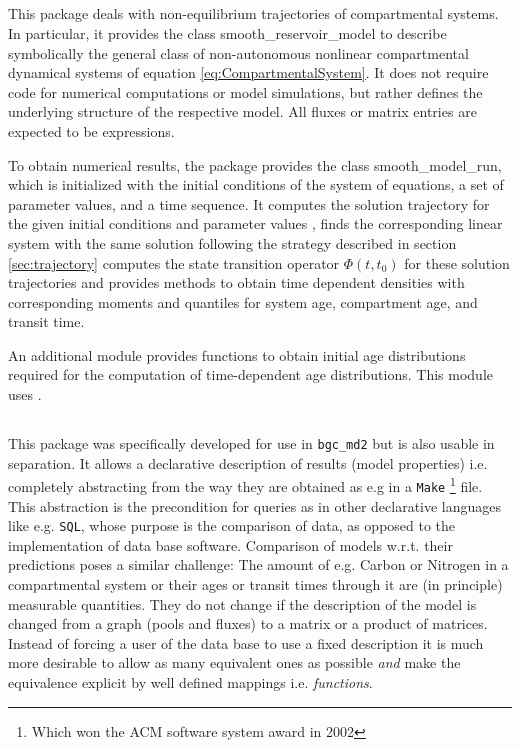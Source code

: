 \subsection{\CompartmentalSystems{}}
This package deals with non-equilibrium trajectories of compartmental systems.
In particular, it provides the class smooth\_reservoir\_model to describe
symbolically the general class of non-autonomous nonlinear compartmental
dynamical systems of equation \eqref{eq:CompartmentalSystem}. It does not
require code for numerical computations or model simulations, but rather defines the underlying structure of the respective model. 
All fluxes or matrix entries are expected to be \sympy{} 
expressions. 

To obtain numerical results, the package
provides the class smooth\_model\_run, which is initialized with the initial
conditions of the system of equations, a set of parameter values, and a time
sequence. It computes the solution trajectory for the given initial conditions and
parameter values , finds the corresponding linear system with the same solution
following the strategy described in section \ref{sec:trajectory} computes the
state transition operator $\Phi(t, t_0)$ for these solution trajectories and 
provides methods to obtain time dependent densities with corresponding moments and quantiles for system age, compartment age, and transit time. 

An additional module provides functions to obtain initial age distributions
required for the computation of time-dependent age distributions. 
This module uses \LAPM{}.

\subsection{\ComputabilityGraphs{}}
This package was specifically developed for use in \texttt{bgc\_md2} but is also usable in separation.
It allows a declarative description of results (model properties) i.e. completely abstracting from the way they are obtained as e.g in a \texttt{Make} 
\footnote{Which won the ACM software system award in 2002} file.  This
abstraction is the precondition for queries as in other declarative languages
like e.g. \texttt{SQL}, whose purpose is the comparison of data, as opposed to
the implementation of data base software.  Comparison of models w.r.t. their
predictions poses a similar challenge: The amount of e.g. Carbon or Nitrogen in
a compartmental system or their ages or transit times through it are (in
principle) measurable quantities. They do not change if the description of the
model is changed from a graph (pools and fluxes) to a matrix or a product of matrices.
Instead of forcing a user of the data base to use a fixed
description it is much more desirable to allow as many equivalent ones as
possible \emph{and} make the equivalence explicit by  well defined mappings i.e. \emph{functions}.

